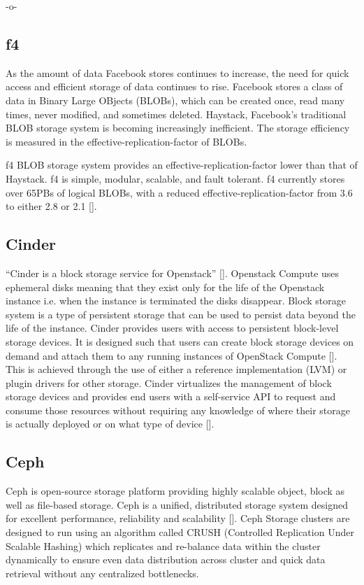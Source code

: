      -o-

\subsection{f4}
     
As the amount of data Facebook stores continues to increase, the need
for quick access and efficient storage of data continues to rise.
Facebook stores a class of data in Binary Large OBjects (BLOBs), which
can be created once, read many times, never modified, and sometimes
deleted. Haystack, Facebook's traditional BLOB storage system is
becoming increasingly inefficient. The storage efficiency is measured
in the effective-replication-factor of BLOBs.

f4 BLOB storage system provides an effective-replication-factor lower
than that of Haystack. f4 is simple, modular, scalable, and fault
tolerant. f4 currently stores over 65PBs of logical BLOBs, with a
reduced effective-replication-factor from 3.6 to either 2.8 or 2.1
[\cite{paper-f4}].

     
\subsection{Cinder}
      
``Cinder is a block storage service for
Openstack'' [\cite{wiki-Cinder}]. Openstack Compute uses ephemeral disks
meaning that they exist only for the life of the Openstack instance
i.e. when the instance is terminated the disks disappear. Block
storage system is a type of persistent storage that can be used to
persist data beyond the life of the instance. Cinder provides users
with access to persistent block-level storage devices. It is designed
such that users can create block storage devices on demand and attach
them to any running instances of OpenStack
Compute [\cite{book-Cinder}]. This is achieved through the use of either
a reference implementation (LVM) or plugin drivers for other
storage. Cinder virtualizes the management of block storage devices
and provides end users with a self-service API to request and consume
those resources without requiring any knowledge of where their storage
is actually deployed or on what type of device [\cite{wiki-Cinder}].
     
\subsection{Ceph }

Ceph is open-source storage platform providing highly scalable object,
block as well as file-based storage. Ceph is a unified, distributed
storage system designed for excellent performance, reliability and
scalability [\cite{www-ceph}]. Ceph Storage clusters are designed to run
using an algorithm called CRUSH (Controlled Replication Under Scalable
Hashing) which replicates and re-balance data within the cluster
dynamically to ensure even data distribution across cluster and quick
data retrieval without any centralized bottlenecks.
 
